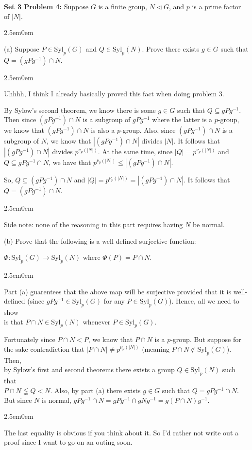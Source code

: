 \documentclass{book}
\newcommand{\myComment}{%
   \color{RawerSienna}%
   \fontsize{12}{14}\selectfont%
}
\newcommand{\HexOne}{%
   \color{Purple}%
   \fontsize{12}{13}\selectfont%
}
\newcommand{\HexPPP}{%
   \color{VioletRed}%
   \fontsize{11}{12}\selectfont%
}
\newenvironment{myIndent}{%
   \begin{adjustwidth}{2.5em}{0em}%
}{%
   \end{adjustwidth}%
}
\newcommand{\blab}[1]{\textbf{#1}}
\newcommand{\Syl}{\mathrm{Syl}}
\newcommand{\retTwo}{\hfill\bigbreak}
\begin{document}
\blab{Set 3 Problem 4:} Suppose $G$ is a finite group, $N \lhd G$, and $p$ is a prime factor of $|N|$.
\begin{myIndent}
	\item[(a)] Suppose $P \in \Syl_p(G)$ and $Q \in \Syl_p(N)$. Prove there exists $g \in G$ such that\\ $Q = (gPg^{-1}) \cap N$.
	
	\begin{myIndent}\HexOne
		Uhhhh, I think I already basically proved this fact when doing problem 3.\retTwo

		By Sylow's second theorem, we know there is some $g \in G$ such that $Q \subseteq gPg^{-1}$. Then since $(gPg^{-1}) \cap N$ is a subgroup of $gPg^{-1}$ where the latter is a $p$-group, we know that $(gPg^{-1}) \cap N$ is also a $p$-group. Also, since $(gPg^{-1}) \cap N$ is a subgroup of $N$, we know that $|(gPg^{-1}) \cap N|$ divides $|N|$. It follows that $|(gPg^{-1}) \cap N|$ divides $p^{\nu_p(|N|)}$. At the same time, since $|Q| = p^{\nu_p(|N|)}$ and $Q \subseteq gPg^{-1} \cap N$, we have that $p^{\nu_p(|N|)} \leq |(gPg^{-1}) \cap N|$.\retTwo

		So, $Q \subseteq (gPg^{-1}) \cap N$ and $|Q| = p^{\nu_p(|N|)} = |(gPg^{-1}) \cap N|$. It follows that\\ $Q = (gPg^{-1}) \cap N$.
		\begin{myIndent}\myComment
			Side note: none of the reasoning in this part requires having $N$ be normal.\retTwo
		\end{myIndent}
	\end{myIndent}
	
	\item[(b)] Prove that the following is a well-defined surjective function:
	
	{\centering $\Phi : \Syl_p(G) \to \Syl_p(N)$ where $\Phi(P) = P \cap N$. \retTwo\par}

	\begin{myIndent}\HexOne
		Part (a) guarentees that the above map will be surjective provided that it is well-\\defined (since $gPg^{-1} \in \Syl_p(G)$ for any $P \in \Syl_p(G)$). Hence, all we need to show\\ is that $P \cap N \in \Syl_p(N)$ whenever $P \in \Syl_p(G)$.\retTwo

		Fortunately since $P \cap N < P$, we know that $P \cap N$ is a $p$-group. But suppose for\\ the sake contradiction that $|P \cap N| \neq p^{\nu_p(|N|)}$ (meaning $P \cap N \notin \Syl_p(G)$). Then,\\ by Sylow's first and second theorems there exists a group $Q \in \Syl_p(N)$ such that\\ $P \cap N \lneqq Q < N$. Also, by part (a) there exists $g \in G$ such that $Q = gPg^{-1} \cap N$. But since $N$ is normal, $gPg^{-1} \cap N = gPg^{-1} \cap gNg^{-1} = g(P \cap N)g^{-1}$.
		\begin{myIndent}\HexPPP
			The last equality is obvious if you think about it. So I'd rather not write out a proof since I want to go on an outing soon.\retTwo
		\end{myIndent}


\end{myIndent}
\end{myIndent}
\end{document}
